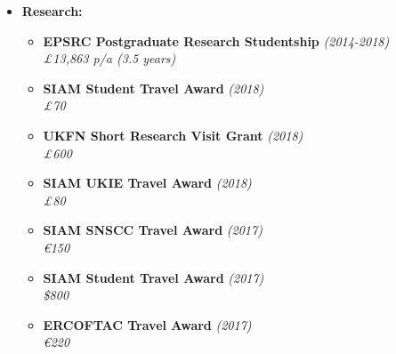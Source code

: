 \documentclass[10pt,a4paper,sans]{moderncv}        %
\begin{document}
		\begin{itemize}
		
			\item \textbf{Research:}
			
			\vspace{6pt}
			
			\begin{itemize}
				
				\item \textbf{EPSRC Postgraduate Research Studentship} \hfill \textit{(2014-2018)} \\
				\textit{£13,863 p/a (3.5 years)}
				
				\vspace{2pt}
				
				\item \textbf{SIAM Student Travel Award} \hfill\textit{(2018)}\\
				\textit{£70}
				
				\vspace{2pt}
				
				\item \textbf{UKFN Short Research Visit Grant} \hfill\textit{(2018)}\\
				\textit{£600}
				
				\vspace{2pt}
				
				\item \textbf{SIAM UKIE Travel Award} \hfill\textit{(2018)}\\
				\textit{£80}
				
				\vspace{2pt}
				
				\item \textbf{SIAM SNSCC Travel Award} \hfill \textit{(2017)}\\
				\textit{\euro{}150}
				
				\vspace{2pt}
				
				\item \textbf{SIAM Student Travel Award} \hfill\textit{(2017)}\\
				\textit{\$800}
				
				\vspace{2pt}
				
				\item \textbf{ERCOFTAC Travel Award} \hfill\textit{(2017)}\\
				\textit{\euro{}220}

				\vspace{2pt}
				

\end{itemize}
\end{itemize}
\end{document}
